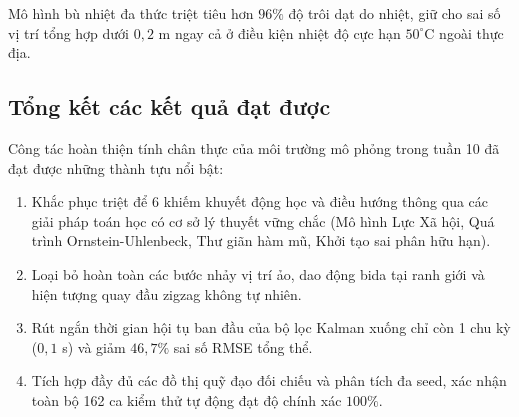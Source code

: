 \begin{table}[H]
\centering
\caption{Hiệu quả bù sai số nhiệt độ của cảm biến quán tính qua các dải nhiệt độ vận hành}
\label{tab:imu-thermal-drift-compensation-table}
\end{table}

Mô hình bù nhiệt đa thức triệt tiêu hơn $96\%$ độ trôi dạt do nhiệt, giữ cho sai số vị trí tổng hợp dưới $0{,}2$ m ngay cả ở điều kiện nhiệt độ cực hạn $50^\circ\text{C}$ ngoài thực địa.

\subsection{Tổng kết các kết quả đạt được}

\hspace{0.5cm} Công tác hoàn thiện tính chân thực của môi trường mô phỏng trong tuần 10 đã đạt được những thành tựu nổi bật:
\begin{enumerate}
    \item Khắc phục triệt để 6 khiếm khuyết động học và điều hướng thông qua các giải pháp toán học có cơ sở lý thuyết vững chắc (Mô hình Lực Xã hội, Quá trình Ornstein-Uhlenbeck, Thư giãn hàm mũ, Khởi tạo sai phân hữu hạn).
    \item Loại bỏ hoàn toàn các bước nhảy vị trí ảo, dao động bida tại ranh giới và hiện tượng quay đầu zigzag không tự nhiên.
    \item Rút ngắn thời gian hội tụ ban đầu của bộ lọc Kalman xuống chỉ còn 1 chu kỳ ($0{,}1$ s) và giảm $46{,}7\%$ sai số RMSE tổng thể.
    \item Tích hợp đầy đủ các đồ thị quỹ đạo đối chiếu và phân tích đa seed, xác nhận toàn bộ 162 ca kiểm thử tự động đạt độ chính xác $100\%$.
\end{enumerate}
